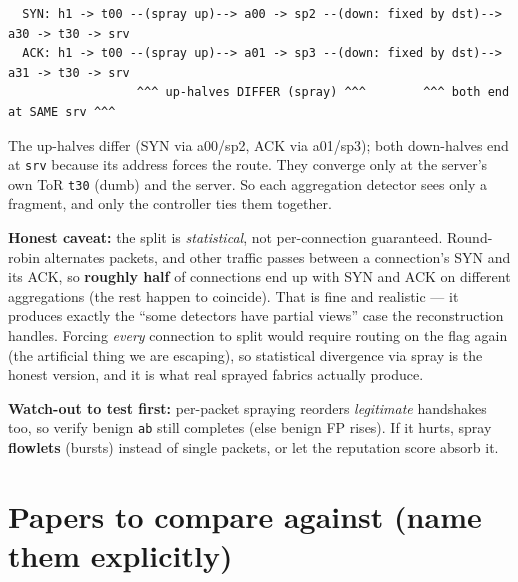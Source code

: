 \documentclass[11pt]{article}
\begin{document}
\begin{verbatim}
  SYN: h1 -> t00 --(spray up)--> a00 -> sp2 --(down: fixed by dst)--> a30 -> t30 -> srv
  ACK: h1 -> t00 --(spray up)--> a01 -> sp3 --(down: fixed by dst)--> a31 -> t30 -> srv
                  ^^^ up-halves DIFFER (spray) ^^^        ^^^ both end at SAME srv ^^^
\end{verbatim}
The up-halves differ (SYN via a00/sp2, ACK via a01/sp3); both down-halves end at \texttt{srv} because its
address forces the route. They converge only at the server's own ToR \texttt{t30} (dumb) and the server.
So each aggregation detector sees only a fragment, and only the controller ties them together.

\textbf{Honest caveat:} the split is \emph{statistical}, not per-connection guaranteed. Round-robin
alternates packets, and other traffic passes between a connection's SYN and its ACK, so \textbf{roughly
half} of connections end up with SYN and ACK on different aggregations (the rest happen to coincide). That
is fine and realistic --- it produces exactly the ``some detectors have partial views'' case the
reconstruction handles. Forcing \emph{every} connection to split would require routing on the flag again
(the artificial thing we are escaping), so statistical divergence via spray is the honest version, and it
is what real sprayed fabrics actually produce.

\textbf{Watch-out to test first:} per-packet spraying reorders \emph{legitimate} handshakes too, so verify
benign \texttt{ab} still completes (else benign FP rises). If it hurts, spray \textbf{flowlets} (bursts)
instead of single packets, or let the reputation score absorb it.

\section{Papers to compare against (name them explicitly)}
\end{document}
